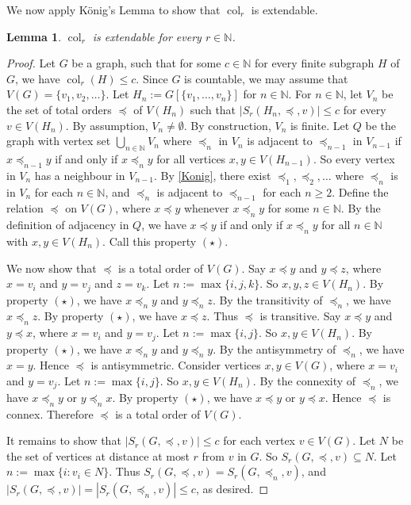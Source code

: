 \documentclass[a4paper,11pt]{article}
\theoremstyle{plain}
\newtheorem{lem}[thm]{Lemma}
\theoremstyle{definition}
\renewcommand{\geq}{\geqslant}
\renewcommand{\leq}{\leqslant}
\DeclareMathOperator{\col}{col}
\newcommand{\sreach}{S}
\newcommand{\NN}{\mathbb{N}}
\begin{document}
We now apply K\"onig's Lemma to show that $\col_r$ is extendable.

\begin{lem}
\label{colExtendable}
$\col_r$ is extendable for every $r\in\NN$.
\end{lem}

\begin{proof}
Let $G$ be a graph, such that for some $c\in\NN$ for every finite subgraph $H$ of $G$, we have $\col_r(H)\leq c$. Since $G$ is countable, we may assume that $V(G)=\{v_1,v_2,\dots\}$. Let $H_n:=G[\{v_1,\dots,v_n\}]$ for $n\in\NN$. For $n\in\NN$, let $V_n$ be the set of total orders $\preceq$ of $V(H_n)$ such that $|\sreach_r(H_n,\preceq,v)|\leq c$ for every $v\in V(H_n)$. By assumption, $V_n\neq\emptyset$. By construction, $V_n$ is finite. Let $Q$ be the graph with vertex set $\bigcup_{n\in\NN} V_n$ where $\preceq_n$ in $V_n$ is adjacent to $\preceq_{n-1}$ in $V_{n-1}$ if $x\preceq_{n-1} y$ if and only if $x\preceq_n y$ for all vertices $x,y\in V(H_{n-1})$. So every vertex in $V_n$ has a neighbour in $V_{n-1}$. By \cref{Konig}, there exist $\preceq_1,\preceq_2,\dots$ where $\preceq_n$ is in $V_n$ for each $n\in \NN$, and $\preceq_n$ is adjacent to $\preceq_{n-1}$ for each $n\geq 2$. Define the relation $\preceq$ on $V(G)$, where $x\preceq y$ whenever $x\preceq_n y$ for some $n\in\NN$. By the definition of adjacency in $Q$, we have $x\preceq y$ if and only if $x\preceq_n y$ for all $n\in \NN$ with $x,y\in V(H_n)$. Call this property $(\star)$. 

We now show that $\preceq$ is a total order of $V(G)$. 
%
Say $x\preceq y$ and $y\preceq z$, where $x=v_i$ and $y=v_j$ and $z=v_k$. %
Let $n:=\max\{i,j,k\}$. So $x,y,z\in V(H_n)$. 
By property $(\star)$, we have $x\preceq_n y$ and $y\preceq_n z$.
By the transitivity of $\preceq_n$, we have $x \preceq_n z$. 
By property $(\star)$, we have $x \preceq z$.
Thus $\preceq$ is transitive. 
%
Say $x\preceq y$ and $y\preceq x$, where $x=v_i$ and $y=v_j$. 
Let $n:=\max\{i,j\}$. So $x,y\in V(H_n)$. 
By property $(\star)$, we have $x\preceq_n y$ and $y\preceq_n y$.
By the antisymmetry of $\preceq_n$, we have $x =y$. 
Hence $\preceq$ is antisymmetric. 
%
Consider vertices $x,y\in V(G)$, where $x=v_i$ and $y=v_j$. 
Let $n:=\max\{i,j\}$. So $x,y\in V(H_n)$. 
By the connexity of $\preceq_n$, we have $x\preceq_n y$ or $y\preceq_n x$.
By property $(\star)$, we have $x\preceq y$ or $y\preceq x$.
Hence $\preceq$ is connex. 
%
Therefore $\preceq$ is a total order of $V(G)$.

It remains to show that $|\sreach_r(G,\preceq,v)| \leq c$ for each vertex $v\in V(G)$. 
Let $N$ be the set of vertices at distance at most $r$ from $v$ in $G$. 
So $\sreach_r(G,\preceq,v) \subseteq N$. 
Let $n:= \max\{ i : v_i \in N\}$. 
Thus $\sreach_r(G,\preceq,v)= \sreach_r(G,\preceq_n,v)$, and 
$|\sreach_r(G,\preceq,v)|= |\sreach_r(G,\preceq_n,v)| \leq c$, as desired. \end{proof}
 
\end{document}
